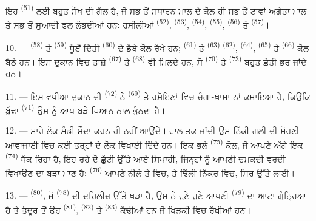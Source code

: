 ਇਹ  \textsuperscript{(51)} ਲਈ ਬਹੁਤ ਸੌਖ ਦੀ ਗੱਲ ਹੈ, ਜੋ ਸਭ ਤੋਂ ਸਧਾਰਨ ਮਾਲ
ਦੇ ਕੋਲ ਹੀ ਸਭ ਤੋਂ ਟਾਵਾਂ ਅਗੇਤਾ ਮਾਲ ਤੇ ਸਭ ਤੋਂ ਸੁਆਦੀ ਫਲ ਲੱਭਦੀਆਂ ਹਨ: ਰਸੀਲੀਆਂ
 \textsuperscript{(52)}, 
\textsuperscript{(53)},  \textsuperscript{(54)}, 
\textsuperscript{(55)},  \textsuperscript{(56)} ਤੇ 
\textsuperscript{(57)}।

\VUsaut{4.0mm}
\VUsaut{3.0mm}

10. ---  \textsuperscript{(58)} ਤੇ  \textsuperscript{(59)}
ਧੂੰਏਂ ਦਿੱਤੀ  \textsuperscript{(60)} ਦੇ ਡੱਬੇ ਕੋਲ ਰੱਖੇ ਹਨ;
 \textsuperscript{(61)} ਤੇ  \textsuperscript{(63)}
 \textsuperscript{(62)},  \textsuperscript{(64)},
 \textsuperscript{(65)} ਤੇ 
\textsuperscript{(66)} ਕੋਲ ਬੈਠੇ ਹਨ। ਇਸ ਦੁਕਾਨ ਵਿਚ ਤਾਜ਼ੇ 
\textsuperscript{(67)} ਤੇ  \textsuperscript{(68)} ਵੀ ਮਿਲਦੇ ਹਨ, ਸੋ
 \textsuperscript{(70)} ਤੇ 
\textsuperscript{(73)} ਬਹੁਤ ਛੇਤੀ ਭਰ ਜਾਂਦੇ ਹਨ।

11. --- ਇਸ ਵਧੀਆ ਦੁਕਾਨ ਦੀ  \textsuperscript{(72)} ਨੇ
 \textsuperscript{(69)} ਤੇ ਰਸੋਇਣਾਂ ਵਿਚ ਚੰਗਾ-ਖ਼ਾਸਾ ਨਾਂ ਕਮਾਇਆ ਹੈ,
ਕਿਉਂਕਿ ਬੁੱਢਾ  \textsuperscript{(71)} ਉਸ ਨੂੰ ਆਪ ਬੜੇ ਧਿਆਨ ਨਾਲ
ਭੁੰਨਦਾ ਹੈ।

\VUsaut{4.0mm}
\VUsaut{3.0mm}

12. --- ਸਾਰੇ ਲੋਕ ਮੰਡੀ ਸੌਦਾ ਕਰਨ ਹੀ ਨਹੀਂ ਆਉਂਦੇ। ਹਾਲ ਤਕ ਜਾਂਦੀ ਉਸ ਨਿੱਕੀ ਗਲੀ ਦੀ ਸੋਹਣੀ
ਆਵਾਜਾਈ ਵਿਚ ਕਈ ਤਰ੍ਹਾਂ ਦੇ ਲੋਕ ਵਿਖਾਈ ਦਿੰਦੇ ਹਨ। ਇਕ ਭਲੇ 
\textsuperscript{(75)} ਕੋਲ, ਜੋ ਆਪਣੇ ਅੱਗੇ ਇਕ  \textsuperscript{(74)}
ਧੱਕ ਰਿਹਾ ਹੈ, ਇਹ ਰਹੇ ਦੋ ਛੁੱਟੀ ਉੱਤੇ ਆਏ ਸਿਪਾਹੀ, ਜਿਨ੍ਹਾਂ ਨੂੰ ਆਪਣੀ ਚਮਕਦੀ ਵਰਦੀ ਵਿਖਾਉਣ
ਦਾ ਬੜਾ ਮਾਣ ਹੈ:  \textsuperscript{(76)} ਆਪਣੇ ਨੀਲੇ  ਤੇ
 ਵਿਚ, ਤੇ  ਢਿੱਲੀ ਨਿੱਕਰ ਵਿਚ, ਸਿਰ
ਉੱਤੇ  ਲਾਈ।

13. ---  \textsuperscript{(80)}, ਜੋ 
\textsuperscript{(78)} ਦੀ ਦਹਿਲੀਜ਼ ਉੱਤੇ ਖੜਾ ਹੈ, ਉਸ ਨੇ ਹੁਣੇ ਹੁਣੇ ਆਪਣੀ 
\textsuperscript{(79)} ਦਾ ਆਟਾ ਗੁੰਨ੍ਹਿਆ ਹੈ ਤੇ ਤੰਦੂਰ ਤੋਂ ਉਹ 
\textsuperscript{(81)},  \textsuperscript{(82)} ਤੇ
 \textsuperscript{(83)} ਕੱਢੀਆਂ ਹਨ ਜੋ ਖਿੜਕੀ ਵਿਚ ਰੱਖੀਆਂ ਹਨ।

